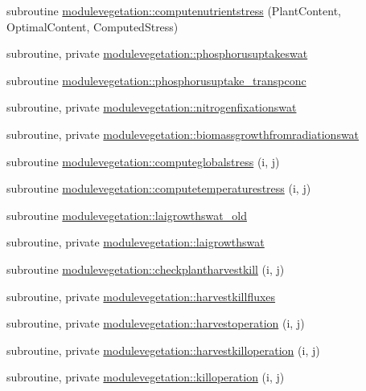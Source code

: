 \begin{DoxyCompactItemize}
\item 
subroutine \mbox{\hyperlink{namespacemodulevegetation_abdb0b0a9e6c19d706d25ff42b84611d2}{modulevegetation\+::computenutrientstress}} (Plant\+Content, Optimal\+Content, Computed\+Stress)
\item 
subroutine, private \mbox{\hyperlink{namespacemodulevegetation_a4d0b983635068517bf0b541f0784430a}{modulevegetation\+::phosphorusuptakeswat}}
\item 
subroutine \mbox{\hyperlink{namespacemodulevegetation_a00089a428473ea96d0f567289aabe4f8}{modulevegetation\+::phosphorusuptake\+\_\+transpconc}}
\item 
subroutine, private \mbox{\hyperlink{namespacemodulevegetation_ac64ef166fcd5b553f404eca77d3f8ad4}{modulevegetation\+::nitrogenfixationswat}}
\item 
subroutine, private \mbox{\hyperlink{namespacemodulevegetation_a156df3425609d782754520991389dc1a}{modulevegetation\+::biomassgrowthfromradiationswat}}
\item 
subroutine \mbox{\hyperlink{namespacemodulevegetation_a9bed5257328690b46cde01cfe91f313a}{modulevegetation\+::computeglobalstress}} (i, j)
\item 
subroutine \mbox{\hyperlink{namespacemodulevegetation_a0a72b8d43553476da7abbddd263b7c85}{modulevegetation\+::computetemperaturestress}} (i, j)
\item 
subroutine \mbox{\hyperlink{namespacemodulevegetation_a0ec3ba9198a58232c38fd166c72810d5}{modulevegetation\+::laigrowthswat\+\_\+old}}
\item 
subroutine, private \mbox{\hyperlink{namespacemodulevegetation_a86662f45554df67ceb2fd66d1ff3afd1}{modulevegetation\+::laigrowthswat}}
\item 
subroutine \mbox{\hyperlink{namespacemodulevegetation_a3456662ceedeb9f7d5ad12c24dd83bc4}{modulevegetation\+::checkplantharvestkill}} (i, j)
\item 
subroutine, private \mbox{\hyperlink{namespacemodulevegetation_a68c29b5f11f8bae818809241e638e11a}{modulevegetation\+::harvestkillfluxes}}
\item 
subroutine, private \mbox{\hyperlink{namespacemodulevegetation_a3dc6ee6dd39f0f9ae9bbbe6356b45efc}{modulevegetation\+::harvestoperation}} (i, j)
\item 
subroutine, private \mbox{\hyperlink{namespacemodulevegetation_a5b6084c4fb89b8ce3f29e23d6b623bef}{modulevegetation\+::harvestkilloperation}} (i, j)
\item 
subroutine, private \mbox{\hyperlink{namespacemodulevegetation_a48e334671d44b0f7bf51ba2801d47db0}{modulevegetation\+::killoperation}} (i, j)

\end{DoxyCompactItemize}
